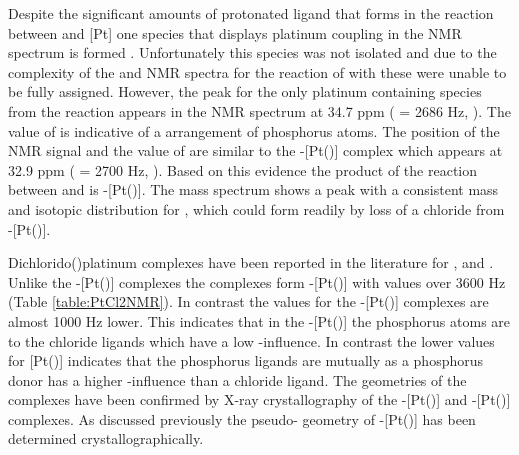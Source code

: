 Despite the significant amounts of protonated \tBusixantphos{} ligand that forms in the reaction between \tBusixantphos{} and [Pt] one species that displays platinum coupling in the \phosphorus{} NMR spectrum is formed .  Unfortunately this species was not isolated and due to the complexity of the \proton{} and \carbon{} NMR spectra for the reaction of \tBusixantphos{} with \ce{[Pt(C6H10)Cl2]} these were unable to be fully assigned.  However, the peak for the only platinum containing species from the reaction appears in the \phosphorus{} NMR spectrum at 34.7 ppm (\JPtP{} = 2686 Hz, ).  The value of \JPtP{} is indicative of a \trans{} arrangement of phosphorus atoms.\cite{Rigamonti2010, Appleton1978, Pregosin1980}  The position of the \phosphorus{} NMR signal and the value of \JPtP{} are similar to the \trans-[Pt(\tButhixantphos)] complex which appears at 32.9 ppm (\JPtP{} = 2700 Hz, ).  Based on this evidence the product of the reaction between \tBusixantphos{} and \ce{[Pt(C6H10)Cl2]} is \trans{}-[Pt(\tBusixantphos)].  The mass spectrum shows a peak with a consistent mass and isotopic distribution for , which could form readily by loss of a chloride from \trans-[Pt(\tBusixantphos)].

Dichlorido(\Phxantphos)platinum complexes have been reported in the literature for \Phsixantphos, \Phthixantphos{} and \Phxantphos{}.\cite{Kranenburg1998b}  Unlike the \trans-[Pt(\tBuxantphos)] complexes the \Phxantphos{} complexes form \cis{}-[Pt(\Phxantphos)] with \JPtP{} values over 3600 Hz (Table \ref{table:PtCl2NMR}).  In contrast the \JPtP{} values for the \trans-[Pt(\tBuxantphos)] complexes are almost 1000 Hz lower.  This indicates that in the \cis-[Pt(\Phxantphos)] the phosphorus atoms are \trans{} to the chloride ligands which have a low \trans-influence.  In contrast the lower values for [Pt(\tBuxantphos)] indicates that the phosphorus ligands are mutually \trans{} as a phosphorus donor has a higher \trans-influence than a chloride ligand.  The \cis{} geometries of the \Phxantphos{} complexes have been confirmed by X-ray crystallography of the \cis{}-[Pt(\Phsixantphos)]\cite{Duren2007} and \cis{}-[Pt(\Phxantphos)]\cite{Niksch2010} complexes.  As discussed previously the pseudo-\trans{} geometry of \trans-[Pt(\tButhixantphos)] has been determined crystallographically. 

